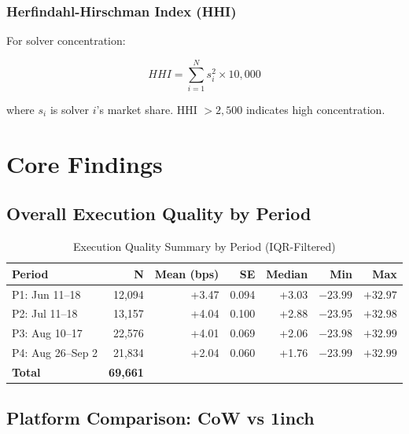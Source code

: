 \documentclass[11pt,a4paper]{article}
\begin{document}
\subsubsection{Herfindahl-Hirschman Index (HHI)}

For solver concentration:

\begin{equation}
HHI = \sum_{i=1}^{N} s_i^2 \times 10,000
\end{equation}

where $s_i$ is solver $i$'s market share. HHI $> 2,500$ indicates high concentration.

\section{Core Findings}

\subsection{Overall Execution Quality by Period}

\begin{table}[H]
\centering
\caption{Execution Quality Summary by Period (IQR-Filtered)}
\begin{tabular}{lrrrrrr}
\toprule
\textbf{Period} & \textbf{N} & \textbf{Mean (bps)} & \textbf{SE} & \textbf{Median} & \textbf{Min} & \textbf{Max} \\
\midrule
P1: Jun 11--18 & 12,094 & +3.47 & 0.094 & +3.03 & $-23.99$ & $+32.97$ \\
P2: Jul 11--18 & 13,157 & +4.04 & 0.100 & +2.88 & $-23.95$ & $+32.98$ \\
P3: Aug 10--17 & 22,576 & +4.01 & 0.069 & +2.06 & $-23.98$ & $+32.99$ \\
P4: Aug 26--Sep 2 & 21,834 & +2.04 & 0.060 & +1.76 & $-23.99$ & $+32.99$ \\
\midrule
\textbf{Total} & \textbf{69,661} & & & & & \\
\bottomrule
\end{tabular}
\end{table}

\subsection{Platform Comparison: CoW vs 1inch}
\end{document}
